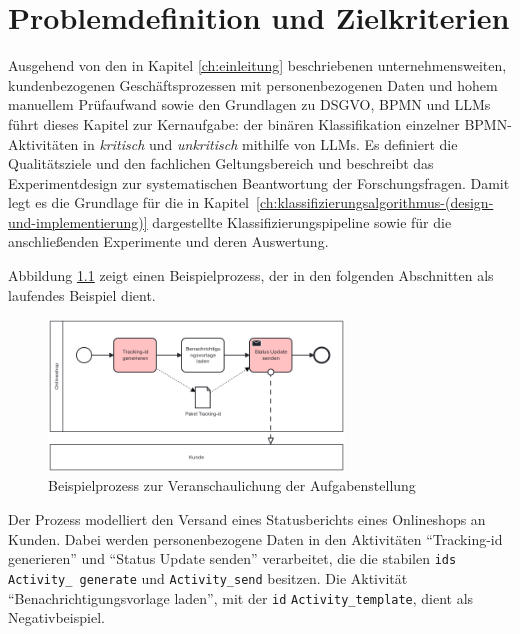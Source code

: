 \chapter{Problemdefinition und Zielkriterien}\label{ch:problemdefinition-und-zielkriterien}

Ausgehend von den in Kapitel \ref{ch:einleitung} beschriebenen unternehmensweiten, kundenbezogenen Geschäftsprozessen mit personenbezogenen Daten und hohem manuellem Prüfaufwand sowie den Grundlagen zu \ac{DSGVO}, \ac{BPMN} und \acp{LLM} führt dieses Kapitel zur Kernaufgabe: der binären Klassifikation einzelner \ac{BPMN}-Aktivitäten in \emph{kritisch} und \emph{unkritisch} mithilfe von \acp{LLM}. Es definiert die Qualitätsziele und den fachlichen Geltungsbereich und beschreibt das Experimentdesign zur systematischen Beantwortung der Forschungsfragen. Damit legt es die Grundlage für die in Kapitel~\ref{ch:klassifizierungsalgorithmus-(design-und-implementierung)} dargestellte Klassifizierungspipeline sowie für die anschließenden Experimente und deren Auswertung.

Abbildung \ref{fig:running_example} zeigt einen Beispielprozess, der in den folgenden Abschnitten als laufendes Beispiel dient.

\begin{figure}[h]
    \centering
    \includegraphics[width=0.7\textwidth]{images/running_example}
    \caption{Beispielprozess zur Veranschaulichung der Aufgabenstellung}
    \label{fig:running_example}
\end{figure}

Der Prozess modelliert den Versand eines Statusberichts eines Onlineshops an Kunden. Dabei werden personenbezogene Daten in den Aktivitäten \enquote{Tracking-id generieren} und \enquote{Status Update senden} verarbeitet, die die stabilen \texttt{ids} \texttt{Activity\_\linebreak~generate} und \texttt{Activity\_send} besitzen. Die Aktivität \enquote{Benachrichtigungsvorlage laden}, mit der \texttt{id} \texttt{Activity\_template}, dient als Negativbeispiel.





